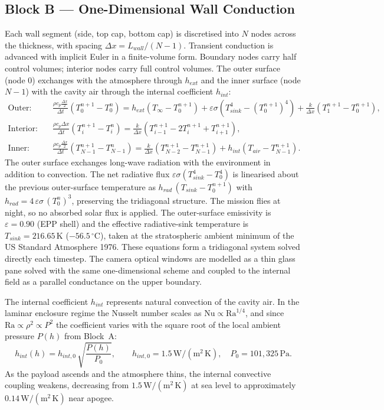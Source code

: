 \documentclass[11pt,a4paper]{article}
\newcommand{\degC}{\,^{\circ}\mathrm{C}}
\newcommand{\unit}[1]{\,\mathrm{#1}}
\begin{document}
\subsection{Block B --- One-Dimensional Wall Conduction}
Each wall segment (side, top cap, bottom cap) is discretised into $N$ nodes across the
thickness, with spacing $\Delta x = L_{wall}/(N-1)$. Transient conduction is advanced
with implicit Euler in a finite-volume form. Boundary nodes carry half control volumes;
interior nodes carry full control volumes. The outer surface (node $0$) exchanges with
the atmosphere through $h_{ext}$ and the inner surface (node $N-1$) with the cavity air
through the internal coefficient $h_{int}$:
\begin{align}
\text{Outer:}\quad &
\frac{\rho c_p \tfrac{\Delta x}{2}}{\Delta t}\left(T_0^{n+1}-T_0^{n}\right)
= h_{ext}\left(T_\infty - T_0^{n+1}\right)
  + \varepsilon\sigma\!\left(T_{sink}^{4}-\left(T_0^{n+1}\right)^{4}\right)
  + \frac{k}{\Delta x}\left(T_1^{n+1}-T_0^{n+1}\right),\\[1mm]
\text{Interior:}\quad &
\frac{\rho c_p \Delta x}{\Delta t}\left(T_i^{n+1}-T_i^{n}\right)
= \frac{k}{\Delta x}\left(T_{i-1}^{n+1}-2T_i^{n+1}+T_{i+1}^{n+1}\right),\\[1mm]
\text{Inner:}\quad &
\frac{\rho c_p \tfrac{\Delta x}{2}}{\Delta t}\left(T_{N-1}^{n+1}-T_{N-1}^{n}\right)
= \frac{k}{\Delta x}\left(T_{N-2}^{n+1}-T_{N-1}^{n+1}\right)
  + h_{int}\left(T_{air}-T_{N-1}^{n+1}\right).
\end{align}
The outer surface exchanges long-wave radiation with the environment in addition to
convection. The net radiative flux $\varepsilon\sigma(T_{sink}^{4}-T_0^{4})$ is
linearised about the previous outer-surface temperature as
$h_{rad}\,(T_{sink}-T_0^{n+1})$ with $h_{rad}=4\,\varepsilon\sigma\,(T_0^{n})^{3}$,
preserving the tridiagonal structure. The mission flies at night, so no absorbed solar
flux is applied. The outer-surface emissivity is $\varepsilon=0.90$ (EPP shell) and the
effective radiative-sink temperature is $T_{sink}=216.65\unit{K}$ ($-56.5\degC$), taken
at the stratospheric ambient minimum of the US Standard Atmosphere 1976. These
equations form a tridiagonal system solved directly each timestep. The camera optical
windows are modelled as a thin glass pane solved with the same one-dimensional scheme
and coupled to the internal field as a parallel conductance on the upper boundary.

The internal coefficient $h_{int}$ represents natural convection of the cavity air.
In the laminar enclosure regime the Nusselt number scales as
$\mathrm{Nu}\propto\mathrm{Ra}^{1/4}$, and since $\mathrm{Ra}\propto\rho^{2}\propto P^{2}$
the coefficient varies with the square root of the local ambient pressure $P(h)$ from
Block~A:
\begin{equation}
h_{int}(h) = h_{int,0}\,\sqrt{\frac{P(h)}{P_0}},
\qquad h_{int,0}=1.5\unit{W/(m^2\,K)},\quad P_0 = 101{,}325\unit{Pa}.
\end{equation}
As the payload ascends and the atmosphere thins, the internal convective coupling
weakens, decreasing from $1.5\unit{W/(m^2\,K)}$ at sea level to approximately
$0.14\unit{W/(m^2\,K)}$ near apogee.
\end{document}
